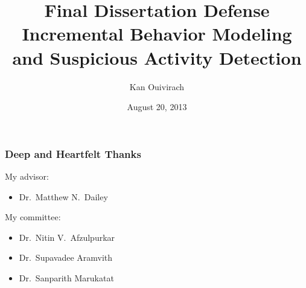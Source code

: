 \documentclass{beamer}
\title[Final Dissertation Defense] {
    Final Dissertation Defense \\
    {\bf Incremental Behavior Modeling and Suspicious 
    Activity Detection}
}
\author[KO] {
    Kan Ouivirach
}
\institute[CSIM-AIT] {
    Computer Science and Information Management\\
    Asian Institute of Technology
}
\date{August 20, 2013}
\begin{document}


\frame{\titlepage}

%


\begin{frame}
    \frametitle{Deep and Heartfelt Thanks}

    My advisor: 
    \begin{itemize}
        \item Dr.\ Matthew N.\ Dailey 
    \end{itemize}
    My committee:
    \begin{itemize}
        \item Dr.\ Nitin V.\ Afzulpurkar
        \item Dr.\ Supavadee Aramvith
        \item Dr.\ Sanparith Marukatat
    \end{itemize}

\end{frame}



%








\end{document}
